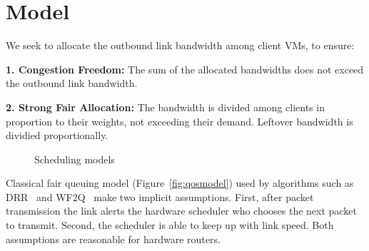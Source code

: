 \section{Model}
\label{sec:model}
We seek to allocate the outbound link bandwidth among client VMs, to ensure:  

{\bf 1. Congestion Freedom:}  The sum of the allocated bandwidths does not
exceed the outbound link bandwidth.

{\bf 2. Strong Fair Allocation: } The bandwidth is divided among clients in
proportion to their weights, not exceeding their demand. Leftover bandwidth is
dividied proportionally.

\begin{figure}[t]
\center
{}
\vspace{-0.2em}
\caption{Scheduling models}
\label{fig:sched_mod}
\vspace{-0.5em}
\end{figure}

Classical fair queuing model (Figure~\ref{fig:qosmodel}) used by algorithms such
as DRR~\cite{drr} and WF2Q~\cite{wf2q} make two implicit assumptions. First,
after packet transmission the link alerts the hardware scheduler who chooses the
next packet to transmit. Second, the scheduler is able to keep up with link
speed.  Both assumptions are reasonable for hardware routers.

